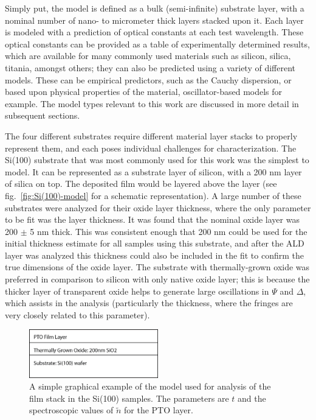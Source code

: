 Simply put, the model is defined as a bulk (semi-infinite) substrate layer, with a nominal number of nano- to micrometer thick layers stacked upon it. Each layer is modeled with a prediction of optical constants at each test wavelength. These optical constants can be provided as a table of experimentally determined results, which are available for many commonly used materials such as silicon, silica, titania, amongst others; they can also be predicted using a variety of different models. These can be empirical predictors, such as the Cauchy dispersion, or based upon physical properties of the material, oscillator-based models for example. The model types relevant to this work are discussed in more detail in subsequent sections. 

The four different substrates require different material layer stacks to properly represent them, and each poses individual challenges for characterization. The Si(100) substrate that was most commonly used for this work was the simplest to model. It can be represented as a substrate layer of silicon, with a 200 nm layer of silica on top. The deposited film would be layered above the  layer (see fig.~\vref{fig:Si(100)-model} for a schematic representation). A large number of these substrates were analyzed for their oxide layer thickness, where the only parameter to be fit was the layer thickness. It was found that the nominal oxide layer was 200 $\pm$ 5 nm thick. This was consistent enough that 200 nm could be used for the initial thickness estimate for all samples using this substrate, and after the ALD layer was analyzed this thickness could also be included in the fit to confirm the true dimensions of the oxide layer. The substrate with thermally-grown oxide was preferred in comparison to silicon with only native oxide layer; this is because the thicker layer of transparent oxide helps to generate large oscillations in $\Psi$ and $\Delta$, which assists in the analysis (particularly the thickness, where the fringes are very closely related to this parameter). 

\begin{figure}[tb]
   \centering
   \includegraphics[width=0.5\textwidth]{./figures/DataAnalysis/ellipsometry-model}
   \caption[Graphical Schematic of VASE Model]{A simple graphical example of the model used for %
   					analysis of the film stack in the Si(100) samples. The parameters %
					are $t$ and the spectroscopic values of $\tilde{n}$ for the PTO layer.}
   \label{fig:Si(100)-model}
\end{figure}

